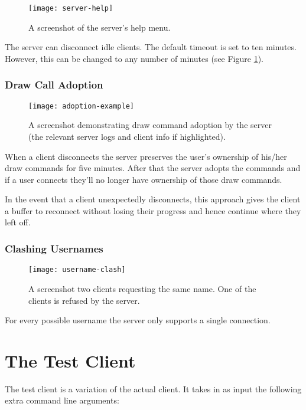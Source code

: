 \documentclass[article]{uom-coursework}
\begin{document}
\begin{figure}[H]
\centering
\texttt{[image: server-help]}
\caption{A screenshot of the server's help menu.}
\label{fig:serverhelp}
\end{figure}

The server can disconnect idle clients. The default timeout is
set to ten minutes. However, this can be changed to any number
of minutes (see Figure \ref{fig:serverhelp}).

\subsubsection{Draw Call Adoption}

\begin{figure}[H]
\centering
\texttt{[image: adoption-example]}
\caption{A screenshot demonstrating draw command adoption by the
server (the relevant server logs and client info if
highlighted).}
\label{fig:useradoption}
\end{figure}

When a client disconnects the server preserves the user's
ownership of his/her draw commands for five minutes. After
that the server adopts the commands and if a user connects
they'll no longer have ownership of those draw commands.

In the event that a client unexpectedly disconnects, this
approach gives the client a buffer to reconnect without losing
their progress and hence continue where they left off.

\subsubsection{Clashing Usernames}

\begin{figure}[H]
\centering
\texttt{[image: username-clash]}
\caption{A screenshot two clients requesting the same name. One
of the clients is refused by the server.}
\label{fig:usernameclash}
\end{figure}

For every possible username the server only supports a single
connection.

\section{The Test Client}

The test client is a variation of the actual client. It
takes in as input the following extra command line arguments:
\end{document}
